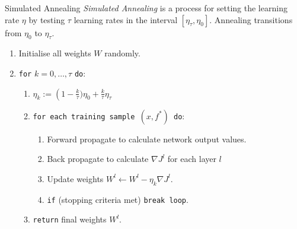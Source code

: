 \documentclass[11pt,a4paper]{article}
\begin{document}
  \begin{definition}{Simulated Annealing}
    \textit{Simulated Annealing} is a process for setting the learning rate $\eta$ by testing $\tau$ learning rates in the interval $[\eta_\tau,\eta_0]$. Annealing transitions from $\eta_0$ to $\eta_\tau$.
    \begin{enumerate}
      \item Initialise all weights $W$ randomly.
      \item \texttt{for} $k=0,\dots,\tau$ \texttt{do}:
      \begin{enumerate}
        \item $\eta_k:=\left(1-\frac{k}\tau)\eta_0+\frac{k}\tau\eta_\tau$
        \item \texttt{for each training sample $(x,f^*)$ do}:
        \begin{enumerate}
          \item Forward propagate to calculate network output values.
          \item Back propagate to calculate $\nabla J^l$ for each layer $l$
          \item Update weights $W^l\leftarrow W^l-\eta_k\nabla J^l$.
          \item \texttt{if} (stopping criteria met) \texttt{break loop}.
        \end{enumerate}
        \item \texttt{return} final weights $W^l$.
      \end{enumerate}
    \end{enumerate}
  \end{definition}
\end{document}
